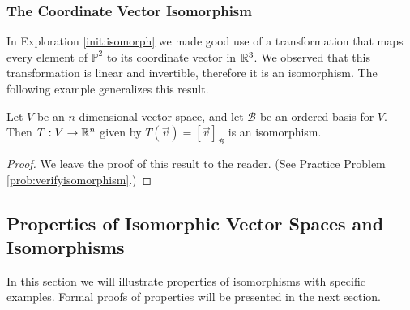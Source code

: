 \documentclass{ximera}
\begin{document}
\subsubsection*{The Coordinate Vector Isomorphism}
In Exploration \ref{init:isomorph} we made good use of a transformation that maps every element of $\mathbb{P}^2$ to its coordinate vector in $\mathbb{R}^3$.  We observed that this transformation is linear and invertible, therefore it is an isomorphism.  The following example generalizes this result.

\begin{theorem}\label{ex:coordmapiso}
Let $V$ be an $n$-dimensional vector space, and let $\mathcal{B}$ be an ordered basis for $V$.  Then  $T:V\rightarrow \mathbb{R}^n$ given by $T(\vec{v})=[\vec{v}]_{\mathcal{B}}$ is an isomorphism.
\end{theorem}
\begin{proof}
We leave the proof of this result to the reader.  (See Practice Problem \ref{prob:verifyisomorphism}.)
\end{proof}

\subsection*{Properties of Isomorphic Vector Spaces and Isomorphisms}  In this section we will illustrate properties of isomorphisms with specific examples.  Formal proofs of properties will be presented in the next section.
\end{document}
